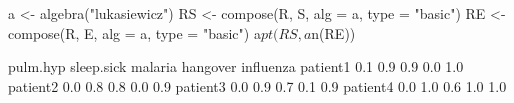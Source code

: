 \begin{Schunk}
% --begin: "comp.circ.excl"
\begin{Sinput}
 a <- algebra("lukasiewicz")
 RS <- compose(R, S, alg = a, type = "basic")
 RE <- compose(R, E, alg = a, type = "basic")
 a$pt(RS, a$n(RE))
\end{Sinput}
\begin{Soutput}
         pulm.hyp sleep.sick malaria hangover influenza
patient1      0.1        0.9     0.9      0.0       1.0
patient2      0.0        0.8     0.8      0.0       0.9
patient3      0.0        0.9     0.7      0.1       0.9
patient4      0.0        1.0     0.6      1.0       1.0
\end{Soutput}
%
% --end: "comp.circ.excl"
\end{Schunk}
